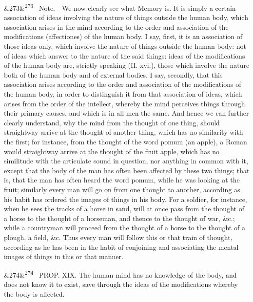 \documentclass[12pt]{article}
\newcommand{\para}[1][]{\par\noindent\ifx&#1&\else\textsuperscript{\footnotesize #1}~\fi}
\begin{document}
\para[273] Note.---We now clearly see what Memory is. It is simply a certain association of ideas involving the nature of things outside the human body, which association arises in the mind according to the order and association of the modifications (affectiones) of the human body. I say, first, it is an association of those ideas only, which involve the nature of things outside the human body: not of ideas which answer to the nature of the said things: ideas of the modifications of the human body are, strictly speaking (II. xvi.), those which involve the nature both of the human body and of external bodies. I say, secondly, that this association arises according to the order and association of the modifications of the human body, in order to distinguish it from that association of ideas, which arises from the order of the intellect, whereby the mind perceives things through their primary causes, and which is in all men the same. And hence we can further clearly understand, why the mind from the thought of one thing, should straightway arrive at the thought of another thing, which has no similarity with the first; for instance, from the thought of the word pomum (an apple), a Roman would straightway arrive at the thought of the fruit apple, which has no similitude with the articulate sound in question, nor anything in common with it, except that the body of the man has often been affected by these two things; that is, that the man has often heard the word pomum, while he was looking at the fruit; similarly every man will go on from one thought to another, according as his habit has ordered the images of things in his body. For a soldier, for instance, when he sees the tracks of a horse in sand, will at once pass from the thought of a horse to the thought of a horseman, and thence to the thought of war, \&c.; while a countryman will proceed from the thought of a horse to the thought of a plough, a field, \&c. Thus every man will follow this or that train of thought, according as he has been in the habit of conjoining and associating the mental images of things in this or that manner.

\para[274] PROP. XIX. The human mind has no knowledge of the body, and does not know it to exist, save through the ideas of the modifications whereby the body is affected.
\end{document}
